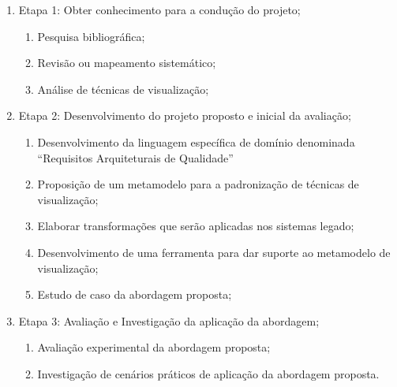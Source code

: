 \documentclass[12pt]{article}
\begin{document}
\begin{enumerate}
\item Etapa 1: Obter conhecimento para a condução do projeto;
    
    \begin{enumerate}
    \item Pesquisa bibliográfica;
    \item Revisão ou mapeamento sistemático;
    \item Análise de técnicas de visualização;
    \end{enumerate}

\item Etapa 2: Desenvolvimento do projeto proposto e inicial da avaliação;

    \begin{enumerate}
    \item Desenvolvimento da linguagem específica de domínio denominada ``Requisitos Arquiteturais de Qualidade''
    \item Proposição de um metamodelo para a padronização de técnicas de visualização;
    \item Elaborar transformações que serão aplicadas nos sistemas legado;
    \item Desenvolvimento de uma ferramenta para dar suporte ao metamodelo de visualização;
    \item Estudo de caso da abordagem proposta;
    \end{enumerate}
    
\item Etapa 3: Avaliação e Investigação da aplicação da abordagem;

    \begin{enumerate}
    \item Avaliação experimental da abordagem proposta;
    \item Investigação de cenários práticos de aplicação da abordagem proposta.
    \end{enumerate}

\end{enumerate}
\end{document}
